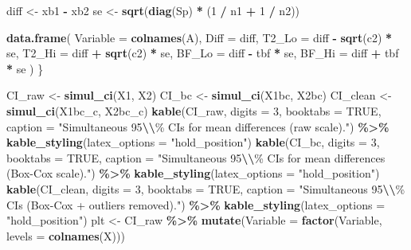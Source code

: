 \documentclass[
  11pt,
]{article}
\newenvironment{Shaded}{\begin{snugshade}}{\end{snugshade}}
\newcommand{\AttributeTok}[1]{\textcolor[rgb]{0.13,0.29,0.53}{#1}}
\newcommand{\ConstantTok}[1]{\textcolor[rgb]{0.56,0.35,0.01}{#1}}
\newcommand{\DecValTok}[1]{\textcolor[rgb]{0.00,0.00,0.81}{#1}}
\newcommand{\FunctionTok}[1]{\textcolor[rgb]{0.13,0.29,0.53}{\textbf{#1}}}
\newcommand{\NormalTok}[1]{#1}
\newcommand{\OtherTok}[1]{\textcolor[rgb]{0.56,0.35,0.01}{#1}}
\newcommand{\SpecialCharTok}[1]{\textcolor[rgb]{0.81,0.36,0.00}{\textbf{#1}}}
\newcommand{\StringTok}[1]{\textcolor[rgb]{0.31,0.60,0.02}{#1}}
\begin{document}
\begin{Shaded}
\begin{Highlighting}[]
\NormalTok{  diff }\OtherTok{\textless{}{-}}\NormalTok{ xb1 }\SpecialCharTok{{-}}\NormalTok{ xb2}
\NormalTok{  se   }\OtherTok{\textless{}{-}} \FunctionTok{sqrt}\NormalTok{(}\FunctionTok{diag}\NormalTok{(Sp) }\SpecialCharTok{*}\NormalTok{ (}\DecValTok{1} \SpecialCharTok{/}\NormalTok{ n1 }\SpecialCharTok{+} \DecValTok{1} \SpecialCharTok{/}\NormalTok{ n2))}

  \FunctionTok{data.frame}\NormalTok{(}
    \AttributeTok{Variable =} \FunctionTok{colnames}\NormalTok{(A),}
    \AttributeTok{Diff     =}\NormalTok{ diff,}
    \AttributeTok{T2\_Lo    =}\NormalTok{ diff }\SpecialCharTok{{-}} \FunctionTok{sqrt}\NormalTok{(c2) }\SpecialCharTok{*}\NormalTok{ se,}
    \AttributeTok{T2\_Hi    =}\NormalTok{ diff }\SpecialCharTok{+} \FunctionTok{sqrt}\NormalTok{(c2) }\SpecialCharTok{*}\NormalTok{ se,}
    \AttributeTok{BF\_Lo    =}\NormalTok{ diff }\SpecialCharTok{{-}}\NormalTok{ tbf      }\SpecialCharTok{*}\NormalTok{ se,}
    \AttributeTok{BF\_Hi    =}\NormalTok{ diff }\SpecialCharTok{+}\NormalTok{ tbf      }\SpecialCharTok{*}\NormalTok{ se}
\NormalTok{  )}
\NormalTok{\}}

\NormalTok{CI\_raw   }\OtherTok{\textless{}{-}} \FunctionTok{simul\_ci}\NormalTok{(X1,     X2)}
\NormalTok{CI\_bc    }\OtherTok{\textless{}{-}} \FunctionTok{simul\_ci}\NormalTok{(X1bc,   X2bc)}
\NormalTok{CI\_clean }\OtherTok{\textless{}{-}} \FunctionTok{simul\_ci}\NormalTok{(X1bc\_c, X2bc\_c)}
\FunctionTok{kable}\NormalTok{(CI\_raw, }\AttributeTok{digits =} \DecValTok{3}\NormalTok{, }\AttributeTok{booktabs =} \ConstantTok{TRUE}\NormalTok{,}
      \AttributeTok{caption =} \StringTok{"Simultaneous 95}\SpecialCharTok{\textbackslash{}\textbackslash{}}\StringTok{\% CIs for mean differences (raw scale)."}\NormalTok{) }\SpecialCharTok{\%\textgreater{}\%}
  \FunctionTok{kable\_styling}\NormalTok{(}\AttributeTok{latex\_options =} \StringTok{"hold\_position"}\NormalTok{)}
\FunctionTok{kable}\NormalTok{(CI\_bc, }\AttributeTok{digits =} \DecValTok{3}\NormalTok{, }\AttributeTok{booktabs =} \ConstantTok{TRUE}\NormalTok{,}
      \AttributeTok{caption =} \StringTok{"Simultaneous 95}\SpecialCharTok{\textbackslash{}\textbackslash{}}\StringTok{\% CIs for mean differences (Box{-}Cox scale)."}\NormalTok{) }\SpecialCharTok{\%\textgreater{}\%}
  \FunctionTok{kable\_styling}\NormalTok{(}\AttributeTok{latex\_options =} \StringTok{"hold\_position"}\NormalTok{)}
\FunctionTok{kable}\NormalTok{(CI\_clean, }\AttributeTok{digits =} \DecValTok{3}\NormalTok{, }\AttributeTok{booktabs =} \ConstantTok{TRUE}\NormalTok{,}
      \AttributeTok{caption =} \StringTok{"Simultaneous 95}\SpecialCharTok{\textbackslash{}\textbackslash{}}\StringTok{\% CIs (Box{-}Cox + outliers removed)."}\NormalTok{) }\SpecialCharTok{\%\textgreater{}\%}
  \FunctionTok{kable\_styling}\NormalTok{(}\AttributeTok{latex\_options =} \StringTok{"hold\_position"}\NormalTok{)}
\NormalTok{plt }\OtherTok{\textless{}{-}}\NormalTok{ CI\_raw }\SpecialCharTok{\%\textgreater{}\%}
  \FunctionTok{mutate}\NormalTok{(}\AttributeTok{Variable =} \FunctionTok{factor}\NormalTok{(Variable, }\AttributeTok{levels =} \FunctionTok{colnames}\NormalTok{(X)))}


\end{Highlighting}
\end{Shaded}
\end{document}
